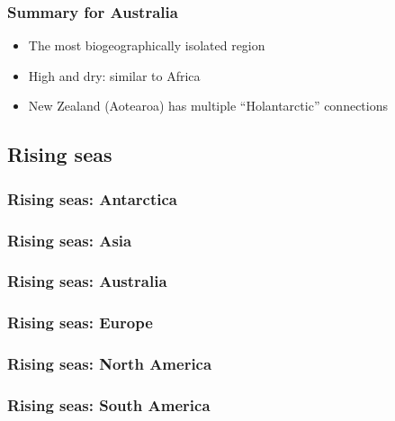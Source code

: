 \documentclass{beamer}
\newcommand{\Max}[1]{\texttt{[image: \#1]}}
\begin{document}

\begin{frame}
\frametitle{Summary for Australia}

\begin{itemize}

\item The most biogeographically isolated region

\item High and dry: similar to Africa

\item New Zealand (Aotearoa) has multiple ``Holantarctic'' connections

\end{itemize}

\end{frame}


\subsection{Rising seas}


\begin{frame}
\frametitle{Rising seas: Antarctica}
\centering
\end{frame}


\begin{frame}
\frametitle{Rising seas: Asia}
\centering
\end{frame}


\begin{frame}
\frametitle{Rising seas: Australia}
\centering
\end{frame}


\begin{frame}
\frametitle{Rising seas: Europe}
\centering
\end{frame}


\begin{frame}
\frametitle{Rising seas: North America}
\centering
\end{frame}


\begin{frame}
\frametitle{Rising seas: South America}
\centering
\end{frame}
\end{document}
